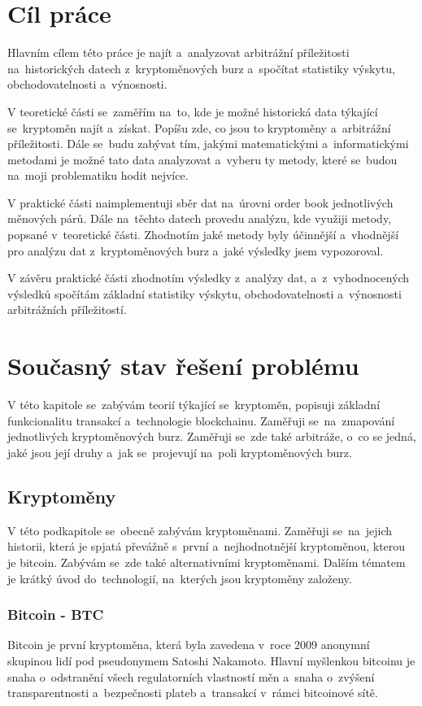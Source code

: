 \documentclass[thesis=B,czech]{FITthesis}[2019/03/21]
\begin{document}
\chapter{Cíl práce}
Hlavním cílem této práce je najít a~analyzovat arbitrážní příležitosti na~historických datech z~kryptoměnových burz a~spočítat statistiky výskytu, obchodovatelnosti a~výnosnosti. 

V teoretické části se~zaměřím na~to, kde je možné historická data týkající se~kryptoměn najít a~získat. Popíšu zde, co jsou to kryptoměny a~arbitrážní příležitosti. Dále se~budu zabývat tím, jakými matematickými a~informatickými metodami je možné tato data analyzovat a~vyberu ty metody, které se~budou na~moji problematiku hodit nejvíce.

V praktické části naimplementuji sběr dat na~úrovni order book jednotlivých měnových párů. Dále na~těchto datech provedu analýzu, kde využiji metody, popsané v~teoretické části. Zhodnotím jaké metody byly účinnější a~vhodnější pro analýzu dat z~kryptoměnových burz a~jaké výsledky jsem vypozoroval.

V závěru praktické části zhodnotím výsledky z~analýzy dat, a~z~vyhodnocených výsledků spočítám základní statistiky výskytu, obchodovatelnosti a~výnosnosti arbitrážních příležitostí. 

\chapter{Současný stav řešení problému}
V této kapitole se~zabývám teorií týkající se~kryptoměn, popisuji základní funkcionalitu transakcí a~technologie blockchainu. Zaměřuji se~na~zmapování jednotlivých kryptoměnových burz. Zaměřuji se~zde také arbitráže, o~co se \linebreak jedná, jaké jsou její druhy a~jak se~projevují na~poli kryptoměnových burz.

\section{Kryptoměny}
V této podkapitole se~obecně zabývám kryptoměnami. Zaměřuji se~na~jejich historii, která je spjatá převážně s~první a~nejhodnotnější kryptoměnou, kterou je bitcoin. Zabývám se~zde také alternativními kryptoměnami. Dalším tématem je krátký úvod do~technologií, na~kterých jsou kryptoměny založeny. \cite{BudoucnostFinTrhu}

\subsection{Bitcoin - BTC}
Bitcoin je první kryptoměna, která byla zavedena v~roce 2009 anonymní skupinou lidí pod pseudonymem Satoshi Nakamoto. Hlavní myšlenkou bitcoinu je snaha o~odstranění všech regulatorních vlastností měn a~snaha o~zvýšení transparentnosti a~bezpečnosti plateb a~transakcí v~rámci bitcoinové sítě. \cite{Finex}
\end{document}
